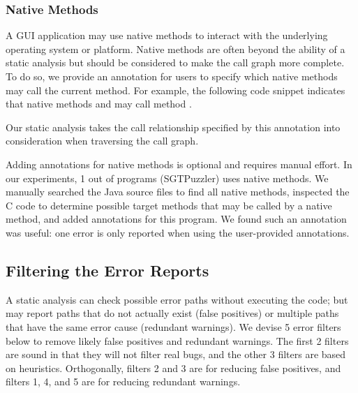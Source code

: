 \subsubsection{Native Methods}
\label{sec:annotation}

A GUI application may use native methods to interact with the underlying
operating system or platform. Native methods are often
beyond the ability of a static analysis but should be considered to make
the call graph more complete. To do so, we provide an annotation 
for users to specify which native methods may call the current method. For example,
the following code snippet indicates that native methods  and 
may call method .

{}

{}


\noindent Our static analysis takes the call relationship specified by this
annotation into consideration when traversing the call graph. 

Adding annotations for native methods is optional and requires manual effort.
In our experiments, 1 out of \subnum programs (SGTPuzzler) uses native methods. We manually
searched the Java source files to find all native methods,
inspected the C code to determine possible target methods
that may be called by a native method, and added \annotationnum annotations for this program.
We found such an annotation was useful: one error
is only reported when using the user-provided annotations.


\subsection{Filtering the Error Reports}
\label{sec:heuristic}

A static analysis can check possible error paths without executing the code; but may report
paths that do not actually exist (false positives) or multiple paths
 that have the same error cause (redundant warnings). We devise
5 error filters below to remove likely false positives and redundant warnings.
The first 2 filters are sound in that they will not filter real bugs, and
the other 3 filters are based on heuristics. Orthogonally, filters 2
and 3 are for reducing false positives, and filters 1, 4, and 5
are for reducing redundant warnings.

